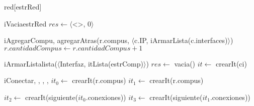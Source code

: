 \begin{Algoritmos}

  \begin{Estructura}{red}[estrRed]

    \begin{Tupla}[estrRed]
    \end{Tupla}

    \begin{Tupla}[estrCompu]
    \end{Tupla}

  \end{Estructura}


  \begin{algoritmo}{iVacia}{}{estrRed}{
    $res \gets \langle$<>, 0$\rangle$ 
  }
  \end{algoritmo}

  \begin{algoritmo}{iAgregarCompu}{, }{}
    agregarAtras(r.compus, $\langle$c.IP, iArmarLista(c.interfaces)$\rangle$)\;
    $r.cantidadCompus \gets r.cantidadCompus+1$ 
  \end{algoritmo}

  \begin{algoritmo}{iArmarLista}{}{lista($\langle$Interfaz, itLista(estrComp)$\rangle$)}
    $res \gets$ vacia()\;
     $it \gets$ crearIt(ci)\;
  \end{algoritmo}
  
  \begin{algoritmo}{iConectar}{, , , , }{}
     $it_{0} \gets$ crearIt(r.compus)\;
     $it_{1} \gets$ crearIt(r.compus)\;

     $it_{2} \gets$ crearIt(siguiente($it_{0}$.conexiones))\;
     $it_{3} \gets$ crearIt(siguiente($it_{1}$.conexiones))\;


\end{algoritmo}
\end{Algoritmos}

